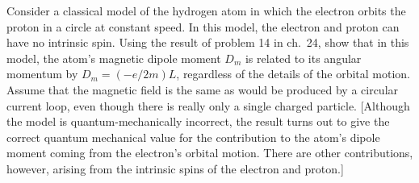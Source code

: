  Consider a classical model of the hydrogen atom in which
the electron orbits the proton in a circle at constant
speed. In this model, the electron and proton can have no
intrinsic spin. Using the result of problem 14 in ch.~24,
show that in this model, the atom's magnetic dipole
moment $D_m$ is related to its angular momentum by
$D_m=(-e/2m)L$, regardless of the details of the orbital
motion. Assume that the magnetic field is the same as would
be produced by a circular current loop, even though there is
really only a single charged particle. [Although the model
is quantum-mechanically incorrect, the result turns out to
give the correct quantum mechanical value for the contribution
to the atom's dipole moment coming from the electron's
orbital motion. There are other contributions, however,
arising from the intrinsic spins of the electron and proton.]
